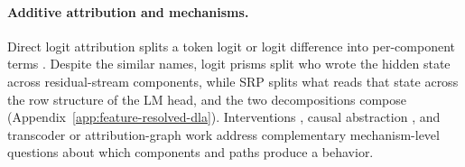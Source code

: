 \paragraph{Additive attribution and mechanisms.}
Direct logit attribution splits a token logit or logit difference into
per-component terms \citep{elhage2021framework,wang2022ioi}. Despite the
similar names, logit prisms \citep{nguyen2024logitprisms} split who wrote
the hidden state across residual-stream components, while SRP splits what
reads that state across the row structure of the LM head, and the two decompositions
compose (Appendix~\ref{app:feature-resolved-dla}). Interventions
\citep{conmy2023acdc}, causal abstraction
\citep{geiger2023causalabstraction}, and transcoder or attribution-graph
work \citep{dunefsky2024transcoders,ameisen2025circuittracing} address
complementary mechanism-level questions about which components and paths
produce a behavior.
